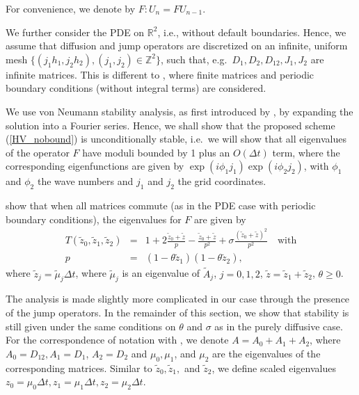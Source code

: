 {For convenience, we denote by $F: U_n = F U_{n-1}$.

We further consider the PDE on $\mathbb{R}^2$, i.e., without default boundaries. Hence, we assume that diffusion and jump operators are discretized on 
 an infinite, uniform mesh $\{(j_1 h_1, j_2 h_2), (j_1, j_2) \in \mathbb{Z}^2\}$, such that, e.g.\ $D_1, D_2, D_{12}, J_1, J_2$ are infinite matrices.
 This is different to \cite{intHoutStability}, where finite matrices and periodic boundary conditions (without integral terms) are considered.

We use von Neumann stability analysis, as first introduced by \cite{charney1950numerical}, by expanding the solution into a Fourier series.
Hence, we shall show that the proposed scheme (\ref{HV_nobound}) is unconditionally stable,
 i.e.\ we will show that all eigenvalues of the operator  $F$ have moduli bounded by 1 plus an $O(\Delta t)$ term,
 where the corresponding eigenfunctions are given by $\exp(i \phi_1 j_1) \exp(i \phi_2 j_2)$, with $\phi_1$ and $\phi_2$ the wave numbers and
 $j_1$ and $j_2$ the grid coordinates.
 
 \cite{intHoutStability} show that when all matrices commute
(as in the PDE case with periodic boundary conditions), 
the eigenvalues for $F$ are given by %
\begin{eqnarray}
\label{defT}
T(\tilde{z}_0, \tilde{z}_1, \tilde{z}_2) &=& 1 + 2 \frac{\tilde{z}_0 + \tilde{z}}{p} - \frac{\tilde{z}_0 + \tilde{z}}{p^2} + \sigma \frac{(\tilde{z}_0 + \tilde{z})^2}{p^2} \quad \text{with} \\
	p &=& (1 - \theta \tilde{z}_1) (1 - \theta \tilde{z}_2), \nonumber
\end{eqnarray}
where $\tilde{z}_j = \tilde{\mu}_j \Delta t$, where $\tilde{\mu}_j$ is an eigenvalue of $\tilde{A}_j$, $j = 0, 1, 2$, $\tilde{z} = \tilde{z}_1 + \tilde{z}_2$, $\theta \ge 0$.


The analysis is made slightly more complicated in our case through the presence of the  jump operators.
In the remainder of this section, %
we show that stability is still given under the same conditions on $\theta$ and $\sigma$ as in the purely diffusive case. For the correspondence of notation with \cite{intHoutStability}, we denote $A = A_0 + A_1 + A_2$, where $A_0 = D_{12}, A_1 = D_1$, $A_2 = D_2$ and $\mu_0, \mu_1$, and $\mu_2$ are the eigenvalues of the corresponding matrices. Similar to $\tilde{z}_0, \tilde{z}_1,$ and $\tilde{z}_2$, we define scaled eigenvalues $z_0 = \mu_0 \Delta t, z_1 = \mu_1 \Delta t, z_2 = \mu_2 \Delta t$.



}
